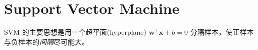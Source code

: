 \chapter{Support Vector Machine}
	SVM 的主要思想是用一个超平面(hyperplane) $ \bm{w}^\intercal \bm{x} + b = 0 $ 分隔样本，使正样本与负样本的\emph{间隔}尽可能大。
	
	
		
	
		
	
	
